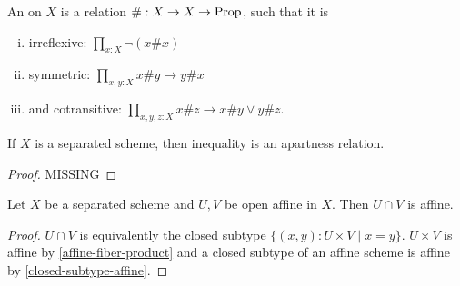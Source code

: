 \begin{definition}
  An  on $X$ is a relation $\#:X\to X\to \mathrm{Prop}$, such that it is
  \begin{enumerate}[(i)]
  \item irreflexive: $\prod_{x:X}\neg(x \# x)$
  \item symmetric: $\prod_{x,y:X} x\# y \to y\# x$
  \item and cotransitive: $\prod_{x,y,z:X} x\# z \to x\# y \vee y\# z$.
  \end{enumerate}
\end{definition}

\begin{proposition}%
  \label{separated-inequality-apartness}
  If $X$ is a separated scheme, then inequality is an apartness relation.
\end{proposition}

\begin{proof}
  MISSING
\end{proof}

\begin{proposition}%
  Let $X$ be a separated scheme and $U,V$ be open affine in $X$.
  Then $U\cap V$ is affine.
\end{proposition}

\begin{proof}
  $U\cap V$ is equivalently the closed subtype $\{(x,y) : U\times V\mid x=y\}$.
  $U\times V$ is affine by \cref{affine-fiber-product} and a closed subtype of an affine scheme is affine by \cref{closed-subtype-affine}.
\end{proof}
